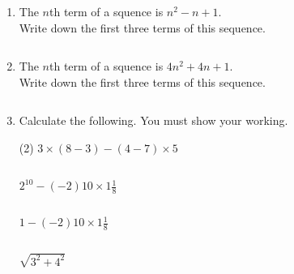 \begin{enumerate} [leftmargin=0cm]
\item   The $n$th term of a squence is $n^2-n+1$. \\             
   Write down the first three terms of this sequence. \\       \begin{envAnswer}[blankline= 2 ] $  $ \end{envAnswer}

\item   The $n$th term of a squence is $4n^2+4n+1$. \\             
   Write down the first three terms of this sequence. \\       \begin{envAnswer}[blankline= 2 ] $  $ \end{envAnswer}















\item Calculate the following. You must show your working.
\begin{tasks}[label=(\alph*), after-item-skip=2pt,after-skip=3pt, label-width=4ex](2)
    \task  $ 3 \times (8-3) - (4-7) \times 5               $                  \\  \begin{envAnswer}[blankline=5]        $       $ \end{envAnswer}
    \task  $ 2^10-(-2)10 \times 1 \frac{1}{8}               $                  \\  \begin{envAnswer}[blankline=5]        $       $ \end{envAnswer}
    \task  $ 1-(-2)10 \times 1 \frac{1}{8}                  $                  \\  \begin{envAnswer}[blankline=5]        $       $ \end{envAnswer}
    \task  $ \sqrt{3^2 + 4^2}                              $                  \\  \begin{envAnswer}[blankline=5]        $       $ \end{envAnswer}
\end{tasks}

\end{enumerate}

\clearpage
